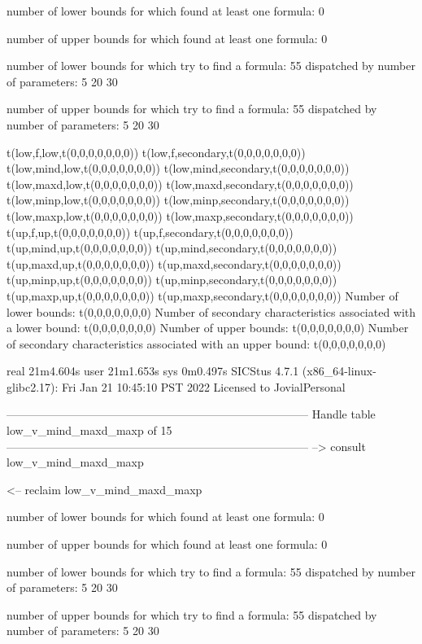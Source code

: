 number of lower bounds for which found at least one formula: 0

number of upper bounds for which found at least one formula: 0

number of lower bounds for which try to find a formula: 55
dispatched by number of parameters: 5  20  30

number of upper bounds for which try to find a formula: 55
dispatched by number of parameters: 5  20  30

t(low,f,low,t(0,0,0,0,0,0,0))
t(low,f,secondary,t(0,0,0,0,0,0,0))
t(low,mind,low,t(0,0,0,0,0,0,0))
t(low,mind,secondary,t(0,0,0,0,0,0,0))
t(low,maxd,low,t(0,0,0,0,0,0,0))
t(low,maxd,secondary,t(0,0,0,0,0,0,0))
t(low,minp,low,t(0,0,0,0,0,0,0))
t(low,minp,secondary,t(0,0,0,0,0,0,0))
t(low,maxp,low,t(0,0,0,0,0,0,0))
t(low,maxp,secondary,t(0,0,0,0,0,0,0))
t(up,f,up,t(0,0,0,0,0,0,0))
t(up,f,secondary,t(0,0,0,0,0,0,0))
t(up,mind,up,t(0,0,0,0,0,0,0))
t(up,mind,secondary,t(0,0,0,0,0,0,0))
t(up,maxd,up,t(0,0,0,0,0,0,0))
t(up,maxd,secondary,t(0,0,0,0,0,0,0))
t(up,minp,up,t(0,0,0,0,0,0,0))
t(up,minp,secondary,t(0,0,0,0,0,0,0))
t(up,maxp,up,t(0,0,0,0,0,0,0))
t(up,maxp,secondary,t(0,0,0,0,0,0,0))
Number of lower bounds:                                             t(0,0,0,0,0,0,0)
Number of secondary characteristics associated with a lower bound:  t(0,0,0,0,0,0,0)
Number of upper bounds:                                             t(0,0,0,0,0,0,0)
Number of secondary characteristics associated with an upper bound: t(0,0,0,0,0,0,0)

real	21m4.604s
user	21m1.653s
sys	0m0.497s
SICStus 4.7.1 (x86_64-linux-glibc2.17): Fri Jan 21 10:45:10 PST 2022
Licensed to JovialPersonal


--------------------------------------------------------------------------------
Handle table low_v_mind_maxd_maxp of 15
--------------------------------------------------------------------------------
--> consult low_v_mind_maxd_maxp

<-- reclaim low_v_mind_maxd_maxp

number of lower bounds for which found at least one formula: 0

number of upper bounds for which found at least one formula: 0

number of lower bounds for which try to find a formula: 55
dispatched by number of parameters: 5  20  30

number of upper bounds for which try to find a formula: 55
dispatched by number of parameters: 5  20  30

